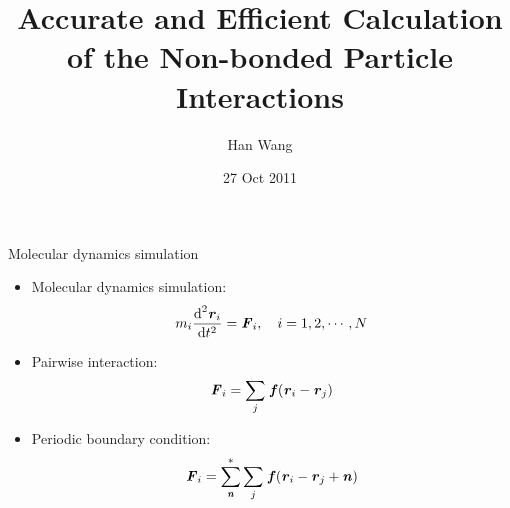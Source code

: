 \documentclass{beamer}
\newcommand{\bluec}[1]{{\color{blue} #1}}
\renewcommand{\v}[1]{\textbf{\textit{#1}}}
\renewcommand{\d}[1]{\textrm{#1}}
\begin{document}
\title[]{Accurate and Efficient Calculation of the Non-bonded Particle Interactions}
%
\author{Han Wang}
\date[27 Oct 2011]{27 Oct 2011}
\frame{\titlepage}


\begin{frame}{Molecular dynamics simulation}
  \begin{itemize}\itemsep -10pt
  \item<1-> Molecular dynamics simulation:
    \bluec{
      \begin{align*}
        m_i \frac{\d d^2\v r_i}{\d dt^2} = \v F_i, \quad i = 1, 2, \cdots, N
      \end{align*}
    }
  \item<2-> Pairwise interaction:
    \bluec{
      \begin{align*}
        \v F_i = \sum_{j}\, \v f(\v r_i - \v r_j)
      \end{align*}}
  \item<3-> Periodic boundary condition:
    \bluec{
      \begin{align*}
        \v F_i = \sum_{\v n}^\ast\sum_{j}\, \v f(\v r_i - \v r_j + \v n)
      \end{align*}}
  \end{itemize}
\end{frame}
\end{document}
